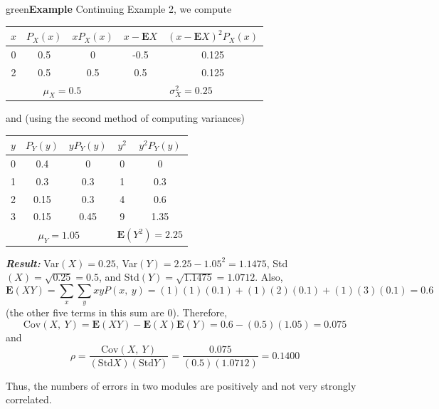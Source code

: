 \documentclass{article}
\begin{document}
\begin{mybox}[breakable]{green}{\textbf{Example}}
    Continuing Example 2, we compute
    \begin{center}
    \begin{tabular}{|c|c|c|c|c|}
    $x$ & $P_X(x)$ & $xP_X(x)$            & $x-\mathbf{E}X$ & $(x-\mathbf{E}X)^2P_X(x)$  \\ 
    \hline
    0   & 0.5      & 0                    & -0.5            & 0.125                      \\
    2   & 0.5      & 0.5                  & 0.5             & 0.125                      \\ 
    \hline
    \multicolumn{3}{|c|}{$\mu_X = 0.5$}   & \multicolumn{2}{c|}{$\sigma_X^2 = 0.25$}    
    \end{tabular}
    \end{center}
    and (using the second method of computing variances)
    \begin{center}
    \begin{tabular}{|c|c|c|c|c|}
    $y$ & $P_Y(y)$ & $yP_Y(y)$            & $y^2$ & $y^2P_Y(y)$                            \\ 
    \hline
    0   & 0.4      & 0                    & 0     & 0                                      \\
    1   & 0.3      & 0.3                  & 1     & 0.3                                    \\
    2   & 0.15     & 0.3                  & 4     & 0.6                                    \\
    3   & 0.15     & 0.45                 & 9     & 1.35                                   \\ 
    \hline
    \multicolumn{3}{|c|}{$\mu_Y = 1.05$}   & \multicolumn{2}{c|}{$\mathbf{E}(Y^2) = 2.25$} 
    \end{tabular}
    \end{center}
    
    \newpage
    \textbf{\textit{Result:}} Var$(X) = 0.25$, Var$(Y) = 2.25 - 1.05^2 = 1.1475$, Std$(X) = \sqrt{0.25} = 0.5$, and Std$(Y) = \sqrt{1.1475} = 1.0712$. Also,
    \begin{equation*}
        \mathbf{E}(XY) = \sum_x \sum_y xy P(x,\ y) = (1)(1)(0.1) + (1)(2)(0.1) + (1)(3)(0.1) = 0.6
    \end{equation*}
    (the other five terms in this sum are 0). Therefore,
    \begin{equation*}
        \text{Cov}(X,\ Y) = \mathbf{E}(XY) - \mathbf{E}(X)\mathbf{E}(Y) = 0.6 - (0.5)(1.05) = 0.075
    \end{equation*}
    and
    \begin{equation*}
        \rho = \frac{\text{Cov}(X,\ Y)}{(\text{Std}X)(\text{Std}Y)} = \frac{0.075}{(0.5)(1.0712)} = 0.1400
    \end{equation*}
    
    Thus, the numbers of errors in two modules are positively and not very strongly correlated.
\end{mybox}
\end{document}
